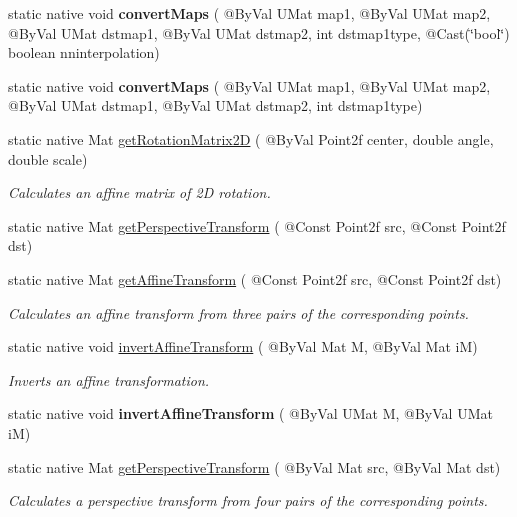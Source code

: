 \begin{DoxyCompactItemize}
\item 
static native void {\bfseries convert\+Maps} ( @By\+Val U\+Mat map1, @By\+Val U\+Mat map2, @By\+Val U\+Mat dstmap1, @By\+Val U\+Mat dstmap2, int dstmap1type, @Cast(\char`\"{}bool\char`\"{}) boolean nninterpolation)
\item 
static native void {\bfseries convert\+Maps} ( @By\+Val U\+Mat map1, @By\+Val U\+Mat map2, @By\+Val U\+Mat dstmap1, @By\+Val U\+Mat dstmap2, int dstmap1type)
\item 
static native Mat \hyperlink{group__imgproc__transform_gab3d97da00a90c299d2899587dc60c4cd}{get\+Rotation\+Matrix2D} ( @By\+Val Point2f center, double angle, double scale)
\begin{DoxyCompactList}\small\item\em Calculates an affine matrix of 2D rotation. \end{DoxyCompactList}\item 
static native Mat \hyperlink{group__imgproc__transform_ga9c65e08c8634d7f7d24ab403dac41b26}{get\+Perspective\+Transform} ( @Const Point2f src, @Const Point2f dst)
\item 
static native Mat \hyperlink{group__imgproc__transform_ga6aff4eb184828799fb795a52309aa8e6}{get\+Affine\+Transform} ( @Const Point2f src, @Const Point2f dst)
\begin{DoxyCompactList}\small\item\em Calculates an affine transform from three pairs of the corresponding points. \end{DoxyCompactList}\item 
static native void \hyperlink{group__imgproc__transform_ga4905a785b488db4f1dbb485efa98356c}{invert\+Affine\+Transform} ( @By\+Val Mat M, @By\+Val Mat iM)
\begin{DoxyCompactList}\small\item\em Inverts an affine transformation. \end{DoxyCompactList}\item 
static native void {\bfseries invert\+Affine\+Transform} ( @By\+Val U\+Mat M, @By\+Val U\+Mat iM)
\item 
static native Mat \hyperlink{group__imgproc__transform_gaf64ca469bb365e0b906e40ecde6eefe5}{get\+Perspective\+Transform} ( @By\+Val Mat src, @By\+Val Mat dst)
\begin{DoxyCompactList}\small\item\em Calculates a perspective transform from four pairs of the corresponding points. \end{DoxyCompactList}\item 

\end{DoxyCompactItemize}
